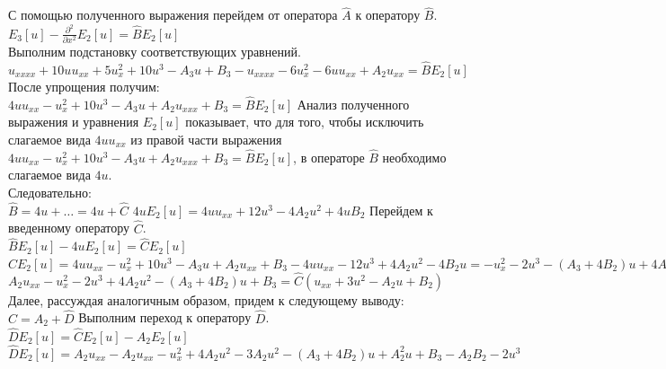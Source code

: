 \documentclass[14pt,a4paper]{article}
\begin{document}
\newline
С помощью полученного выражения перейдем от оператора $\widehat{A}$ к оператору $\widehat{B}$.
\newline
$E_{3} [u] - \frac{\partial^2}{\partial x^2} E_{2} [u] = \widehat{B} E_{2}[u]$ \\
Выполним подстановку соответствующих уравнений. 
\newline
$u_{xxxx} + 10uu_{xx} + 5u_{x}^{2} + 10u^3 - A_{3} u + B_{3} - u_{xxxx} - 6u_{x}^{2} - 6uu_{xx} + A_{2} u_{xx} = \widehat{B} E_{2} [u]$
\newline
После упрощения получим: \\
$4uu_{xx} - u_{x}^{2} + 10u^3 - A_{3}u + A_{2}u_{xxx} + B_{3} = \widehat{B} E_{2} [u]$
\newline
Анализ полученного выражения и уравнения $E_2 [u]$ показывает, что для того, чтобы исключить слагаемое вида $4uu_{xx}$ из правой части выражения $4uu_{xx} - u_{x}^{2} + 10u^3 - A_{3}u + A_{2}u_{xxx} + B_{3} = \widehat{B} E_{2} [u]$, в операторе $\widehat{B}$ необходимо слагаемое вида $4u$.\\
Следовательно: \\
$\widehat{B} = 4u + \dots = 4u + \widehat{C}$
\newline
$4uE_{2} [u] = 4uu_{xx} + 12u^3 - 4A_{2}u^2 + 4uB_{2}$
\newline
Перейдем к введенному оператору $\widehat{C}$. \\
$\widehat{B}E_{2} [u] - 4uE_{2}[u] = \widehat{C} E_{2} [u]$
\newline
$\widehat{C} E_{2} [u] = 4uu_{xx} - u_{x}^{2} + 10u^3 - A_{3} u + A_{2} u_{xx} + B_{3} - 4uu_{xx} - 12u^3 + 4A_{2}u^2 - 4B_{2}u = -u_{x}^{2} - 2u^3 - (A_{3} + 4B_{2})u + 4A_{2}u^2 + A_{2}u_{xx} + B_{3}$
\newline
$A_{2}u_{xx} - u_{x}^{2} - 2u^3 + 4A_{2}u^2 - (A_{3} + 4B_{2})u + B_{3} = \widehat{C}(u_{xx} + 3u^2 - A_{2}u + B_{2})$
\newline
Далее, рассуждая аналогичным образом, придем к следующему выводу: \\
$\widehat{C} = A_{2} + \widehat{D}$
\newline
Выполним переход к оператору $\widehat{D}$. \\
\newline
$\widehat{D} E_{2} [u] = \widehat{C} E_2 [u] - A_{2} E_2 [u]$
\newline
$\widehat{D} E_{2} [u] = A_{2} u_{xx} - A_{2} u_{xx} - u_{x}^{2} + 4A_{2}u^{2} - 3A_{2}u^{2} - (A_{3} + 4B_{2})u + A_{2}^{2} u + B_{3} - A_{2} B_{2} - 2u^3$
\end{document}
